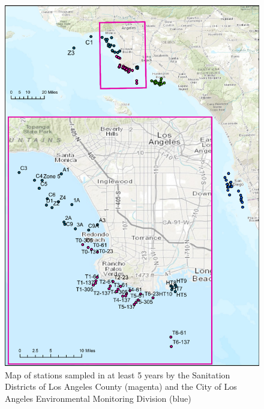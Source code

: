 \documentclass[12pt,]{article}
\begin{document}
\begin{figure}[htbp]
\centering
\includegraphics{Figures/Fleet7_sanitation_map2.pdf}
\caption{Map of stations sampled in at least 5 years by the Sanitation
Districts of Los Angeles County (magenta) and the City of Los Angeles
Environmental Monitoring Division (blue)
\label{fig:Fleet7_sanitation_map2}}
\end{figure}
\end{document}
